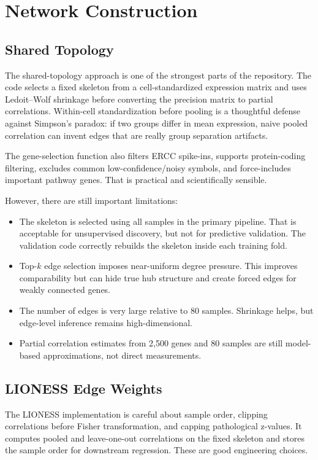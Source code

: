 \documentclass[11pt]{article}
\begin{document}
\section{Network Construction}

\subsection{Shared Topology}

The shared-topology approach is one of the strongest parts of the repository.  The code selects a fixed skeleton from a cell-standardized expression matrix and uses Ledoit--Wolf shrinkage before converting the precision matrix to partial correlations.  Within-cell standardization before pooling is a thoughtful defense against Simpson's paradox: if two groups differ in mean expression, naive pooled correlation can invent edges that are really group separation artifacts.

The gene-selection function also filters ERCC spike-ins, supports protein-coding filtering, excludes common low-confidence/noisy symbols, and force-includes important pathway genes.  That is practical and scientifically sensible.

However, there are still important limitations:
\begin{itemize}[leftmargin=1.5em]
    \item The skeleton is selected using all samples in the primary pipeline.  That is acceptable for unsupervised discovery, but not for predictive validation.  The validation code correctly rebuilds the skeleton inside each training fold.
    \item Top-$k$ edge selection imposes near-uniform degree pressure.  This improves comparability but can hide true hub structure and create forced edges for weakly connected genes.
    \item The number of edges is very large relative to 80 samples.  Shrinkage helps, but edge-level inference remains high-dimensional.
    \item Partial correlation estimates from 2,500 genes and 80 samples are still model-based approximations, not direct measurements.
\end{itemize}

\subsection{LIONESS Edge Weights}

The LIONESS implementation is careful about sample order, clipping correlations before Fisher transformation, and capping pathological z-values.  It computes pooled and leave-one-out correlations on the fixed skeleton and stores the sample order for downstream regression.  These are good engineering choices.
\end{document}
